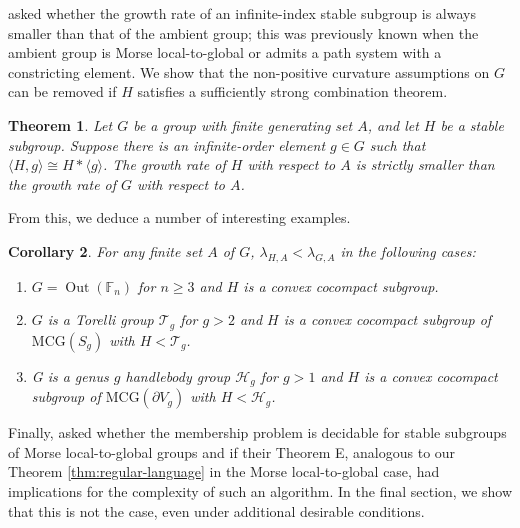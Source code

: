 \documentclass[10pt,a4paper]{amsart}
\newtheorem{thmx}{Theorem}
\newtheorem{corx}[thmx]{Corollary}
\DeclareMathOperator{\Out}{\mathrm{Out}}
\begin{document}
\cite[Question~5]{CRSZ} asked whether the growth rate of an infinite-index stable subgroup is always smaller than that of the ambient group; this was previously known when the ambient group is Morse local-to-global or admits a path system with a constricting element\cite{DFW,CRSZ,Growth-rate-gap-all-Mltg,Abdul-Alex-injective-contracting,Legaspi-path-system-growth}. We show that the non-positive curvature assumptions on $G$ can be removed if $H$ satisfies a sufficiently strong combination theorem.

\begin{thmx}\label{thmx:growth-rate-gap}
    Let $G$ be a group with finite generating set $A$, and let $H$ be a stable subgroup. Suppose there is an infinite-order element $g \in G$ such that $\langle H , g \rangle \cong H * \langle g \rangle$. The growth rate of $H$ with respect to $A$ is strictly smaller than the growth rate of $G$ with respect to $A$.
\end{thmx}

From this, we deduce a number of interesting examples.
\begin{corx}\label{corx:transverse-examples}
    For any finite set $A$ of $G$, $\lambda_{H,A} < \lambda_{G, A}$ in the following cases:
    \begin{enumerate}
        \item $G = \Out(\mathbb{F}_n)$ for $n \geq 3$ and $H$ is a convex cocompact subgroup.
        \item $G$ is a Torelli group $\mathcal{T}_g$ for $g > 2$ and $H$ is a convex cocompact subgroup of $\mathrm{MCG}(S_g)$ with $H < \mathcal{T}_g$.
        \item G is a genus $g$ handlebody group $\mathcal{H}_g$ for $g > 1$ and $H$ is a convex cocompact subgroup of $\mathrm{MCG}(\partial V_g)$ with $H < \mathcal{H}_g$.
    \end{enumerate}
\end{corx}

Finally, \cite[Question~3]{CRSZ} asked whether the membership problem is decidable for stable subgroups of Morse local-to-global groups and if their Theorem E, analogous to our Theorem \ref{thm:regular-language} in the Morse local-to-global case, had implications for the complexity of such an algorithm. In the final section, we show that this is not the case, even under additional desirable conditions.
\end{document}
